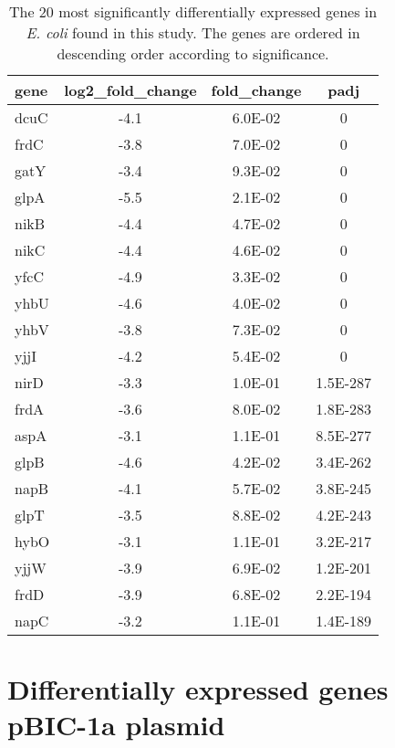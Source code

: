 \begin{table}[ht]
\centering
\caption{The 20 most significantly differentially expressed genes in \textit{E. coli} found in this study. The genes are ordered in descending order according to significance.}
\footnotesize
\begin{tabular}{lccc}
  \hline
 gene& log2\_fold\_change & fold\_change & padj \\ 
  \hline
dcuC & -4.1 & 6.0E-02 & 0 \\ 
  frdC & -3.8 & 7.0E-02 & 0 \\ 
  gatY & -3.4 & 9.3E-02 & 0 \\ 
  glpA & -5.5 & 2.1E-02 & 0 \\ 
  nikB & -4.4 & 4.7E-02 & 0 \\ 
  nikC & -4.4 & 4.6E-02 & 0 \\ 
  yfcC & -4.9 & 3.3E-02 & 0 \\ 
  yhbU & -4.6 & 4.0E-02 & 0 \\ 
  yhbV & -3.8 & 7.3E-02 & 0 \\ 
  yjjI & -4.2 & 5.4E-02 & 0 \\ 
  nirD & -3.3 & 1.0E-01 & 1.5E-287 \\ 
  frdA & -3.6 & 8.0E-02 & 1.8E-283 \\ 
  aspA & -3.1 & 1.1E-01 & 8.5E-277 \\ 
  glpB & -4.6 & 4.2E-02 & 3.4E-262 \\ 
  napB & -4.1 & 5.7E-02 & 3.8E-245 \\ 
  glpT & -3.5 & 8.8E-02 & 4.2E-243 \\ 
  hybO & -3.1 & 1.1E-01 & 3.2E-217 \\ 
  yjjW & -3.9 & 6.9E-02 & 1.2E-201 \\ 
  frdD & -3.9 & 6.8E-02 & 2.2E-194 \\ 
  napC & -3.2 & 1.1E-01 & 1.4E-189 \\ 
   \hline
\end{tabular}
    \label{tabular:E.coli_diff}
\end{table}

\newpage

\section{Differentially expressed genes pBIC-1a plasmid}

